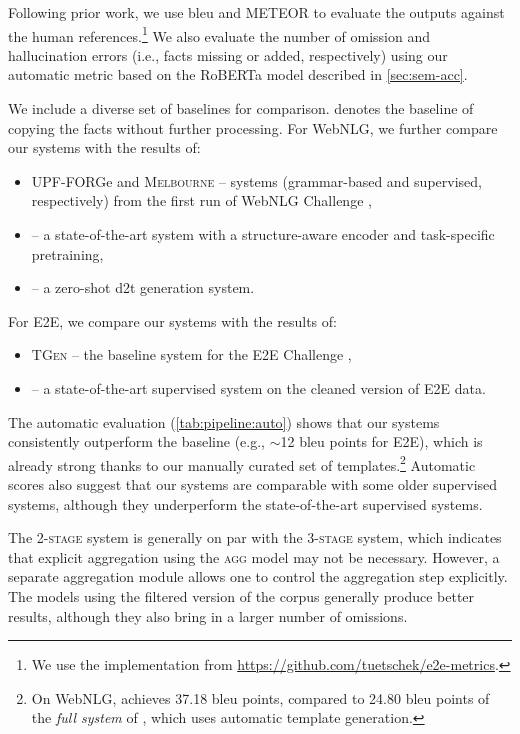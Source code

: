 Following prior work, we use \acs{bleu} \cite{papineni2002bleu} and METEOR \cite{banerjee-lavie-2005-meteor} to evaluate the outputs against the human references.\footnote{We use the implementation from \url{https://github.com/tuetschek/e2e-metrics}.} We also evaluate the number of omission and hallucination errors (i.e., facts missing or added, respectively) using our automatic metric based on the RoBERTa model \cite{liuRoBERTaRobustlyOptimized2019} described in \autoref{sec:sem-acc}.

We include a diverse set of baselines for comparison. \baselinecopy{} denotes the baseline of copying the facts without further processing. For WebNLG, we further compare our systems with the results of:
\begin{itemize}
    \item UPF-FORGe and \textsc{Melbourne} -- systems (grammar-based and supervised, respectively) from the first run of WebNLG Challenge \cite{gardentWebNLGChallengeGenerating2017},
    \item  \citet{keJointGTGraphTextJoint2021} -- a state-of-the-art system with a structure-aware encoder and task-specific pretraining,
    \item \citet{laha2020scalable} -- a zero-shot \ac{d2t} generation system.
\end{itemize}
For E2E, we compare our systems with the results of:
\begin{itemize}
    \item \textsc{TGen} \cite{dusekTrainingNaturalLanguage2015} -- the baseline system for the E2E Challenge \cite{dusekEvaluatingStateoftheartEndtoEnd2020},
    \item \citet{harkousHaveYourText2020} -- a state-of-the-art supervised system on the cleaned version of E2E data.
\end{itemize}

The automatic evaluation (\autoref{tab:pipeline:auto}) shows that our systems consistently outperform the \baselinecopy{} baseline (e.g., $\sim$12 \acs{bleu} points for E2E), which is already strong thanks to our manually curated set of templates.\footnote{On WebNLG, \baselinecopy{} achieves 37.18 \acs{bleu} points, compared to 24.80 \acs{bleu} points of the \textit{full system} of \citet{laha2020scalable}, which uses automatic template generation.} Automatic scores also suggest that our systems are comparable with some older supervised systems, although they underperform the state-of-the-art supervised systems.

The \textsc{2-stage} system is generally on par with the \textsc{3-stage} system, which indicates that explicit aggregation using the \textsc{agg} model may not be necessary. However, a separate aggregation module allows one to control the aggregation step explicitly. The models using the filtered version of the corpus generally produce better results, although they also bring in a larger number of omissions.



